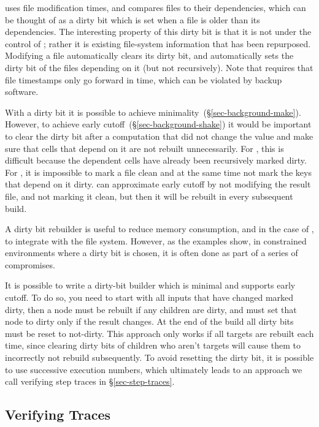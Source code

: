 \Make uses file modification times, and compares files to their dependencies,
which can be thought of as a dirty bit which is set when a file is older than
its dependencies. The interesting property of this dirty bit is that it is not
under the control of \Make; rather it is existing file-system information that
has been repurposed. Modifying a file automatically clears its dirty bit, and
automatically sets the dirty bit of the files depending on it (but not
recursively). Note that \Make requires that file timestamps only go forward in
time, which can be violated by backup software.

With a dirty bit it is possible to achieve
minimality~(\S\ref{sec-background-make}). However, to achieve early
cutoff~(\S\ref{sec-background-shake}) it would be important to clear the dirty
bit after a computation that did not change the value and make sure that cells
that depend on it are not rebuilt unnecessarily. For \Excel, this is difficult
because the dependent cells have already been recursively marked dirty. For
\Make, it is impossible to mark a file clean and at the same time not mark the
keys that depend on it dirty. \Make can approximate early cutoff by not
modifying the result file, and not marking it clean, but then it will be rebuilt
in every subsequent build.

A dirty bit rebuilder is useful to reduce memory consumption, and in the case
of \Make, to integrate with the file system. However, as the examples show, in
constrained environments where a dirty bit is chosen, it is often done as part
of a series of compromises.

It is possible to write a dirty-bit builder which is minimal and supports early
cutoff. To do so, you need to start with all inputs that have changed marked dirty,
then a node must be rebuilt if any children are dirty, and must set that node to dirty
only if the result changes. At the end of the build all dirty bits
must be reset to not-dirty. This approach only works if all targets are rebuilt each time,
since clearing dirty bits of children who aren't targets will cause them to incorrectly
not rebuild subsequently. To avoid resetting the dirty bit,
it is possible to use successive execution numbers, which ultimately leads to an approach
we call verifying step traces in \S\ref{sec-step-traces}.

\subsection{Verifying Traces}\label{sec-verifying-traces}

